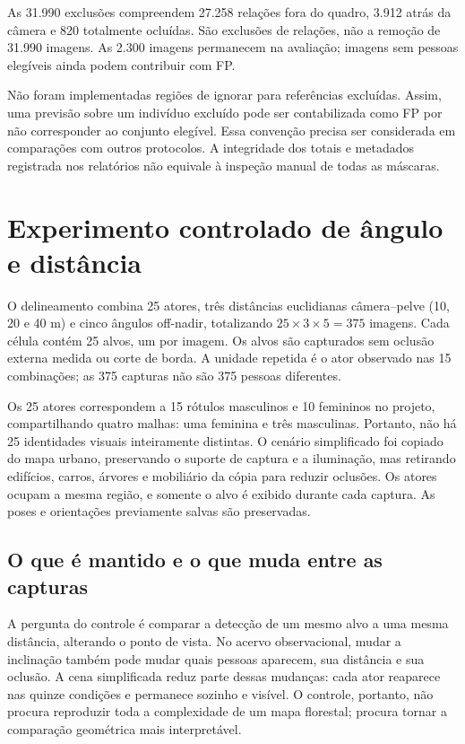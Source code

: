 As 31.990 exclusões compreendem 27.258 relações fora do quadro, 3.912 atrás da câmera e 820 totalmente ocluídas. São exclusões de relações, não a remoção de 31.990 imagens. As 2.300 imagens permanecem na avaliação; imagens sem pessoas elegíveis ainda podem contribuir com FP.

Não foram implementadas regiões de ignorar para referências excluídas. Assim, uma previsão sobre um indivíduo excluído pode ser contabilizada como FP por não corresponder ao conjunto elegível. Essa convenção precisa ser considerada em comparações com outros protocolos. A integridade dos totais e metadados registrada nos relatórios não equivale à inspeção manual de todas as máscaras.

\section{Experimento controlado de ângulo e distância}
O delineamento combina 25 atores, três distâncias euclidianas câmera--pelve (10, 20 e 40 m) e cinco ângulos off-nadir, totalizando $25\times3\times5=375$ imagens. Cada célula contém 25 alvos, um por imagem. Os alvos são capturados sem oclusão externa medida ou corte de borda. A unidade repetida é o ator observado nas 15 combinações; as 375 capturas não são 375 pessoas diferentes.

Os 25 atores correspondem a 15 rótulos masculinos e 10 femininos no projeto, compartilhando quatro malhas: uma feminina e três masculinas. Portanto, não há 25 identidades visuais inteiramente distintas. O cenário simplificado foi copiado do mapa urbano, preservando o suporte de captura e a iluminação, mas retirando edifícios, carros, árvores e mobiliário da cópia para reduzir oclusões. Os atores ocupam a mesma região, e somente o alvo é exibido durante cada captura. As poses e orientações previamente salvas são preservadas.

\subsection{O que é mantido e o que muda entre as capturas}
A pergunta do controle é comparar a detecção de um mesmo alvo a uma mesma distância, alterando o ponto de vista. No acervo observacional, mudar a inclinação também pode mudar quais pessoas aparecem, sua distância e sua oclusão. A cena simplificada reduz parte dessas mudanças: cada ator reaparece nas quinze condições e permanece sozinho e visível. O controle, portanto, não procura reproduzir toda a complexidade de um mapa florestal; procura tornar a comparação geométrica mais interpretável.


